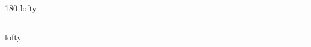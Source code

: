 
\begin{frame}
\begin{center}
\begin{turn}{180}
{\fontsize{2.5cm}{1em}\selectfont lofty}
\end{turn}
\vspace{1em}\par  
\hrule
\vspace{1em}\par  
{\fontsize{2.5cm}{1em}\selectfont lofty}
\end{center}
\end{frame}

